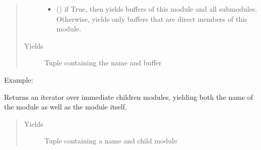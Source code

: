\documentclass[letterpaper,10pt,english]{sphinxmanual}
\begin{document}
\begin{fulllineitems}
\begin{fulllineitems}
\begin{quote}
\begin{description}
\begin{itemize}
\item {} 
 () \textendash{} if True, then yields buffers of this module
and all submodules. Otherwise, yields only buffers that
are direct members of this module.

\end{itemize}

\item[{Yields}] \leavevmode
{} \textendash{} Tuple containing the name and buffer

\end{description}\end{quote}

Example:

\begin{sphinxVerbatim}[commandchars=\\\{\}]
    
      \PYG{p}{[}\PYG{p}{]}
       
\end{sphinxVerbatim}

\end{fulllineitems}


\begin{fulllineitems}
\label{\detokenize{api/dynamics:geology.metamodelling.dynamics.NeuralDifferentialEquation.named_children}}
Returns an iterator over immediate children modules, yielding both
the name of the module as well as the module itself.
\begin{quote}\begin{description}
\item[{Yields}] \leavevmode
{} \textendash{} Tuple containing a name and child module


\end{description}
\end{quote}
\end{fulllineitems}
\end{fulllineitems}
\end{document}
